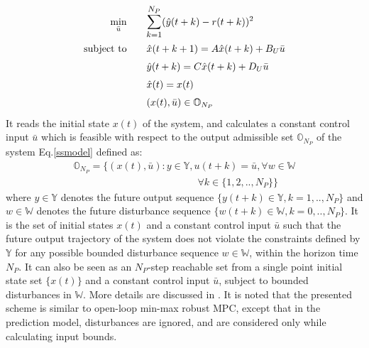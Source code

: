\documentclass[letterpaper, 10 pt, conference]{ieeeconf}  %
\newcommand{\AB}[1]{\textbf{\color{magenta}{[AB: #1]}}}
\begin{document}
  	\begin{equation}
  	\small
  	\begin{aligned}
  	\underset{\bar{u}}{\text{min}}
  	&  \hspace{20pt} \mathlarger{\sum\limits_{k=1}^{N_P}}(\hat y(t+k)-r(t+k))^2 \\
  	\text{subject to}
  	& \hspace{20pt} \hat{x}(t+k+1) = A\hat{x}(t+k) + B_U\bar{u}\\
  	& \hspace{20pt} \hat y(t+k) = C\hat{x}(t+k) + D_U\bar{u} \\
  	& \hspace{20pt} \hat{x}(t)=x(t) \\
  	& \hspace{20pt} (x(t),\bar{u}) \in \mathbb{O}_{N_P}
  	\end{aligned}
  	\label{RMPC}
  	\end{equation}
  It reads the initial state $x(t)$ of the system, and calculates a constant control input $\bar{u}$ which is feasible with respect to the output admissible set $\mathbb{O}_{N_P}$ of the system Eq.\eqref{ssmodel} defined as:
  \begin{equation}
  \begin{matrix}
  \mathbb{O}_{N_P} = \{(x(t),\bar{u}):y\in \mathbb{Y}, u(t+k)=\bar{u},\forall w \in \mathbb{W}  \\ \hspace{150pt} \forall k \in \{1,2,..,N_P\} \}
  \end{matrix}
  \label{O_form}
  \end{equation}
  where $y \in \mathbb{Y}$ denotes the future output sequence $\{y(t+k)\in\mathbb{Y},k=1,..,N_P\}$
  and $w \in \mathbb{W}$ denotes the future disturbance sequence $\{w(t+k)\in\mathbb{W},k=0,..,N_P\}$.
  It is the set of initial states $x(t)$ and a constant control input $\bar{u}$ such that the future output trajectory of the system does not violate the constraints defined by $\mathbb{Y}$ for any possible bounded disturbance sequence $w\in\mathbb{W}$, within the horizon time $N_P$. It can also be seen as an $N_P$-step reachable set from a single point initial state set $\{x(t)\}$ and a constant control input $\bar{u}$, subject to bounded disturbances in $\mathbb{W}$. More details are discussed in \cite{Predictivecontrol}. It is noted that the presented scheme is similar to open-loop min-max robust MPC, except that in the prediction model, disturbances are ignored, and are considered only while calculating input bounds.
\end{document}
